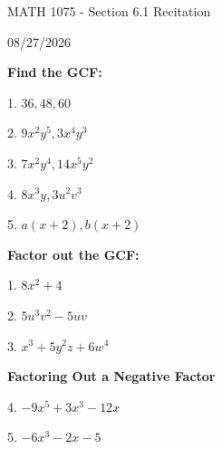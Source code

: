 \documentclass[12pt]{article}
\begin{document}
\vspace*{0.5in}

\begin{center}
    {\LARGE MATH 1075 - Section 6.1 Recitation}

    \vspace{2em}

    {\large 08/27/2026}
\end{center}

\vspace{2em}

\textbf{Find the GCF:}

\vspace{1.5em}

1. $36, 48, 60$

\vspace{4.5em}

2. $9x^{2}y^{5}, 3x^{4}y^{3}$

\vspace{4.5em}

3. $7x^{2}y^{4}, 14x^{5}y^{2}$

\vspace{4.5em}

4. $8x^{3}y, 3u^{2}v^{3}$

\vspace{4.5em}

5. $a(x + 2), b(x + 2)$

\newpage

\textbf{Factor out the GCF:}

\vspace{1.5em}

1. $8x^{2}+4$

\vspace{4.5em}

2. $5u^{3}v^{2}-5uv$

\vspace{4.5em}

3. $x^{3}+5y^{2}z+6w^{4}$

\vspace{4.5em}

\textbf{\large Factoring Out a Negative Factor}

\vspace{1.5em}

4. $-9x^{5}+3x^{3}-12x$

\vspace{4.5em}

5. $-6x^{3}-2x-5$

\newpage

\vspace*{0.5in}
\end{document}

